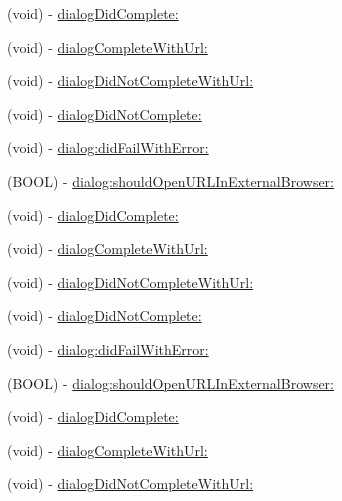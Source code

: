 \begin{DoxyCompactItemize}
\item 
(void) -\/ \hyperlink{protocol_f_b_dialog_delegate-p_a90dbc90d847c73d4b7c46851dad27088}{dialog\-Did\-Complete\-:}
\item 
(void) -\/ \hyperlink{protocol_f_b_dialog_delegate-p_a59efe809bb196af4b1888651c396e786}{dialog\-Complete\-With\-Url\-:}
\item 
(void) -\/ \hyperlink{protocol_f_b_dialog_delegate-p_a87a756757aef6af9bc35dafcab6cd259}{dialog\-Did\-Not\-Complete\-With\-Url\-:}
\item 
(void) -\/ \hyperlink{protocol_f_b_dialog_delegate-p_a1a9d02c6b2ea3cd0cd836daaa4a8c436}{dialog\-Did\-Not\-Complete\-:}
\item 
(void) -\/ \hyperlink{protocol_f_b_dialog_delegate-p_a72d2d07e22a7ecc75565bcfcbe4948ad}{dialog\-:did\-Fail\-With\-Error\-:}
\item 
(\-B\-O\-O\-L) -\/ \hyperlink{protocol_f_b_dialog_delegate-p_a78ae11dc38f12fb05c0d9658c76825d1}{dialog\-:should\-Open\-U\-R\-L\-In\-External\-Browser\-:}
\item 
(void) -\/ \hyperlink{protocol_f_b_dialog_delegate-p_a90dbc90d847c73d4b7c46851dad27088}{dialog\-Did\-Complete\-:}
\item 
(void) -\/ \hyperlink{protocol_f_b_dialog_delegate-p_a59efe809bb196af4b1888651c396e786}{dialog\-Complete\-With\-Url\-:}
\item 
(void) -\/ \hyperlink{protocol_f_b_dialog_delegate-p_a87a756757aef6af9bc35dafcab6cd259}{dialog\-Did\-Not\-Complete\-With\-Url\-:}
\item 
(void) -\/ \hyperlink{protocol_f_b_dialog_delegate-p_a1a9d02c6b2ea3cd0cd836daaa4a8c436}{dialog\-Did\-Not\-Complete\-:}
\item 
(void) -\/ \hyperlink{protocol_f_b_dialog_delegate-p_a72d2d07e22a7ecc75565bcfcbe4948ad}{dialog\-:did\-Fail\-With\-Error\-:}
\item 
(\-B\-O\-O\-L) -\/ \hyperlink{protocol_f_b_dialog_delegate-p_a78ae11dc38f12fb05c0d9658c76825d1}{dialog\-:should\-Open\-U\-R\-L\-In\-External\-Browser\-:}
\item 
(void) -\/ \hyperlink{protocol_f_b_dialog_delegate-p_a90dbc90d847c73d4b7c46851dad27088}{dialog\-Did\-Complete\-:}
\item 
(void) -\/ \hyperlink{protocol_f_b_dialog_delegate-p_a59efe809bb196af4b1888651c396e786}{dialog\-Complete\-With\-Url\-:}
\item 
(void) -\/ \hyperlink{protocol_f_b_dialog_delegate-p_a87a756757aef6af9bc35dafcab6cd259}{dialog\-Did\-Not\-Complete\-With\-Url\-:}
\item 

\end{DoxyCompactItemize}
